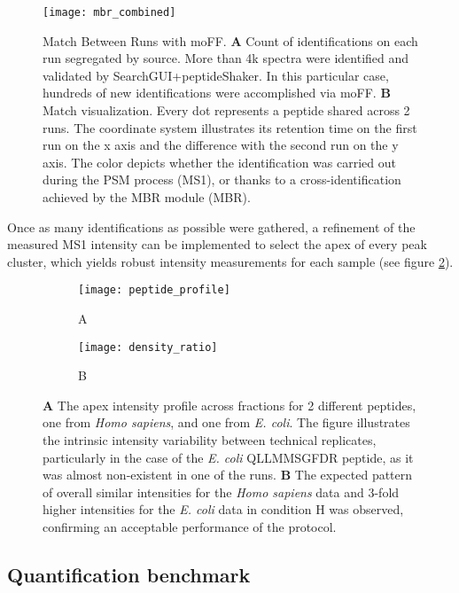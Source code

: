 \begin{figure}[H]
\centering
\texttt{[image: mbr\_combined]}
\caption[Proteome benchmark MBR results]{Match Between Runs with moFF. \textbf{A} Count of identifications on each run segregated by source. More than 4k spectra were identified and validated by SearchGUI+peptideShaker. In this particular case, hundreds of new identifications were accomplished via moFF. \textbf{B} Match visualization. Every dot represents a peptide shared across 2 runs. The coordinate system illustrates its retention time on the first run on the x axis and the difference with the second run on the y axis. The color depicts whether the identification was carried out during the PSM process (MS1), or thanks to a cross-identification achieved by the MBR module (MBR).}
\label{fig:mbr}
\end{figure}

Once as many identifications as possible were gathered, a refinement of the measured MS1 intensity can be implemented to select the apex of every peak cluster, which yields robust intensity measurements for each sample (see figure \ref{fig:apex_intensity}). 

\begin{figure}[H]
\begin{subfigure}{.9\textwidth}
  \centering
    \caption*{A}
\texttt{[image: peptide\_profile]}
\end{subfigure}
\bigskip

\begin{subfigure}{.9\textwidth}
  \centering
    \caption*{B}
\texttt{[image: density\_ratio]}
\end{subfigure}
\caption[Proteome benchmark apex MS1 intensity results]{\textbf{A} The apex intensity profile across fractions for 2 different peptides, one from \textit{Homo sapiens}, and one from \textit{E. coli}. The figure illustrates the intrinsic intensity variability between technical replicates, particularly in the case of the \textit{E. coli} QLLMMSGFDR peptide, as it was almost non-existent in one of the runs. \textbf{B} The expected pattern of overall similar intensities for the \textit{Homo sapiens} data and 3-fold higher intensities for the \textit{E. coli} data in condition H was observed, confirming an acceptable performance of the protocol.}
\label{fig:apex_intensity}
\end{figure}


\subsection{Quantification benchmark}
\label{subsec:quantification}

